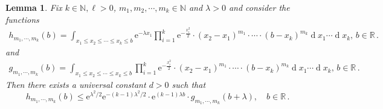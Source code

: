 \documentclass[11pt, reqno]{amsart}
\numberwithin{equation}{section}
\newcounter{dummy} \numberwithin{dummy}{section}
\newtheorem{lemma}[dummy]{Lemma}
\newcommand{\N}{\ensuremath{\mathbb{N}}}
\newcommand{\R}{\ensuremath{\mathbb{R}}}
\newcommand{\diff}{\ensuremath{\operatorname{d}\!}}
\begin{document}
\begin{lemma}
    Fix $k\in \N, \ell> 0$, $m_1, m_2, \cdots, m_k \in \N$ and $\lambda > 0$ and consider the functions
    \begin{equation*}
        \begin{array}{cc}
            h_{m_1, \cdots, m_k}(b) = \displaystyle\int_{x_1\le x_2\le \cdots\le x_k\le b}\mathrm{e}^{-\lambda x_1}\prod_{i=1}^{k}\mathrm{e}^{-\frac{x_i^2}{2}}\cdot(x_2-x_1)^{m_1}\cdot \cdots \cdot (b-x_k)^{m_k}\diff x_1\cdots \diff x_{k},\, b\in \R\,.
        \end{array}
    \end{equation*}
    and 
    \begin{equation*}
        \begin{array}{cc}
            g_{m_1, \cdots, m_k}(b) = \displaystyle\int_{x_1\le x_2\le \cdots\le x_k\le b}\prod_{i=1}^{k}\mathrm{e}^{-\frac{x_i^2}{2}}\cdot(x_2-x_1)^{m_1}\cdot \cdots \cdot (b-x_k)^{m_k}\diff x_1\cdots \diff x_{k},\, b\in \R\,.
        \end{array}
    \end{equation*}
    Then there exists a universal constant $d>0$ such that 
    \[
     h_{m_1, \cdots, m_k}(b)\le \mathrm{e}^{\lambda^2/2}\mathrm{e}^{-(k-1)\lambda^2/2} \cdot \mathrm{e}^{(k-1)\lambda b}\cdot g_{m_1, \cdots, m_k}(b+\lambda), \quad b\in \R\,.
    \]
\end{lemma}
\end{document}
